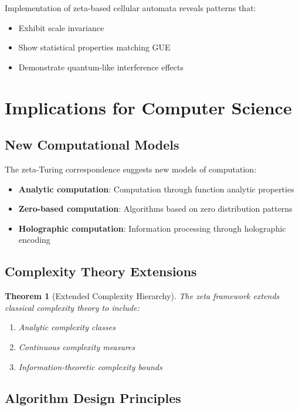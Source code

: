 \documentclass[12pt]{article}
\theoremstyle{plain}
\newtheorem{theorem}{Theorem}[section]
\theoremstyle{definition}
\begin{document}
Implementation of zeta-based cellular automata reveals patterns that:
\begin{itemize}
\item Exhibit scale invariance
\item Show statistical properties matching GUE
\item Demonstrate quantum-like interference effects
\end{itemize}

\section{Implications for Computer Science}

\subsection{New Computational Models}

The zeta-Turing correspondence suggests new models of computation:

\begin{itemize}
\item \textbf{Analytic computation}: Computation through function analytic properties
\item \textbf{Zero-based computation}: Algorithms based on zero distribution patterns
\item \textbf{Holographic computation}: Information processing through holographic encoding
\end{itemize}

\subsection{Complexity Theory Extensions}

\begin{theorem}[Extended Complexity Hierarchy]
The zeta framework extends classical complexity theory to include:
\begin{enumerate}
\item Analytic complexity classes
\item Continuous complexity measures
\item Information-theoretic complexity bounds
\end{enumerate}
\end{theorem}

\subsection{Algorithm Design Principles}
\end{document}
